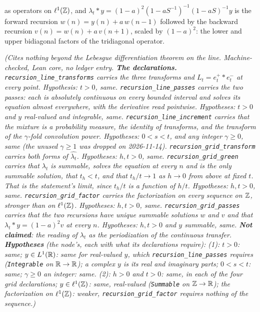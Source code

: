 \begin{proposition}
\begin{enumerate}
\[\]
as operators on $\ell^1(\mathbb{Z})$, and $\lambda_t * y = (1-a)^2(1-aS^{-1})^{-1}(1-aS)^{-1}y$ is the
forward recursion $w(n) = y(n) + a\,w(n-1)$ followed by the backward recursion
$v(n) = w(n) + a\,v(n+1)$, scaled by $(1-a)^2$: the lower and upper bidiagonal factors of the
tridiagonal operator.
\end{enumerate}
\statusT\quad\emph{(Cites nothing beyond the Lebesgue differentiation theorem on the line.
Machine-checked, Lean core, no ledger entry. \textbf{The declarations.}
\texttt{recursion\_line\_transforms} carries the three transforms and $L_t = e^+_t * e^-_t$ at every
point. Hypothesis: $t > 0$, same. \texttt{recursion\_line\_passes} carries the two passes: each
is absolutely continuous on every bounded interval and solves its equation almost everywhere, with
the derivative read pointwise. Hypotheses: $t > 0$ and $y$ real-valued and integrable, same.
\texttt{recursion\_line\_increment} carries that the mixture is a probability measure, the identity
of transforms, and the transform of the $\gamma$-fold convolution power. Hypotheses: $0 < s < t$,
and any integer $\gamma \ge 0$, same (the unused $\gamma \ge 1$ was dropped on 2026-11-14).
\texttt{recursion\_grid\_transform} carries both forms of
$\widehat{\lambda_t}$. Hypotheses: $h, t > 0$, same. \texttt{recursion\_grid\_green} carries
that $\lambda_t$ is summable, solves the equation at every $n$ and is the only summable solution,
that $t_h < t$, and that $t_h/t \to 1$ as $h \to 0$ from above at fixed $t$. That is the
statement's limit, since $t_h/t$ is a function of $h/t$. Hypotheses: $h, t > 0$, same.
\texttt{recursion\_grid\_factor} carries the factorization on every sequence on $\mathbb{Z}$, stronger
than on $\ell^1(\mathbb{Z})$. Hypotheses: $h, t > 0$, same. \texttt{recursion\_grid\_passes} carries
that the two recursions have unique summable solutions $w$ and $v$ and that
$\lambda_t * y = (1-a)^2v$ at every $n$. Hypotheses: $h, t > 0$ and $y$ summable, same.
\textbf{Not claimed}: the reading of $\lambda_t$ as the periodization of the continuous transfer.
\textbf{Hypotheses} (the node's, each with what its declarations require): (1): $t > 0$: same;
$y \in L^1(\mathbb{R})$: same for real-valued $y$, which \texttt{recursion\_line\_passes} requires
(\texttt{Integrable} on $\mathbb{R} \to \mathbb{R}$); a complex $y$ is its real and imaginary parts; $0 < s < t$:
same; $\gamma \ge 0$ an integer: same. (2): $h > 0$ and $t > 0$: same, in each of the four grid
declarations; $y \in \ell^1(\mathbb{Z})$: same, real-valued (\texttt{Summable} on $\mathbb{Z} \to \mathbb{R}$); the
factorization on $\ell^1(\mathbb{Z})$: weaker, \texttt{recursion\_grid\_factor} requires nothing of the
sequence.)}
\end{proposition}

